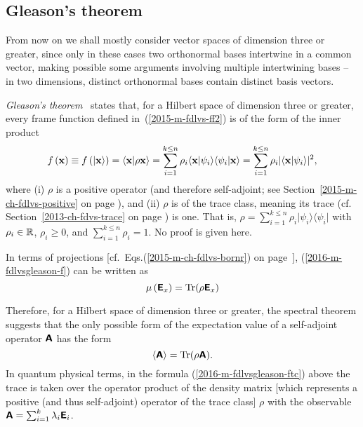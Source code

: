\subsection{Gleason's theorem}
\label{Gleasontheorem}

From now on we shall mostly consider vector spaces of dimension three or greater,
since only in these cases two  orthonormal bases intertwine in a common vector, making possible
some arguments involving multiple intertwining bases  -- in two dimensions,
distinct orthonormal bases contain distinct basis vectors.


{\em Gleason's theorem}~\cite[-50mm]{Gleason,r:dvur-93,pitowsky:218,rich-bridge,peres,hamhalter-book}
states that,
for a Hilbert space of dimension three or greater,
every frame function defined in~(\ref{2015-m-fdlvs-ff2})
is of the form  of the inner product
\begin{equation}
f \left(   {\bf x}   \right)
\equiv
f \left( \vert {\bf x} \rangle \right)
=
\langle {\bf x}  \vert \rho {\bf x} \rangle
=
\sum_{i=1}^{k\le n} \rho_i
\langle {\bf x}  \vert \psi_i\rangle \langle \psi_i \vert {\bf x} \rangle
=
\sum_{i=1}^{k\le n} \rho_i
\vert \langle {\bf x}  \vert \psi_i\rangle \vert^2
,
\label{2016-m-fdlvsgleason-f}
\end{equation}
where
(i) $\rho $
is a positive operator (and therefore self-adjoint;
see Section~\ref{2015-m-ch-fdlvs-positive} on page \pageref{2015-m-ch-fdlvs-positive}),
and
(ii) $\rho $ is
of the trace class,
meaning its trace (cf. Section~\ref{2013-ch-fdvs-trace} on page \pageref{2013-ch-fdvs-trace}) is one.
That is, $\rho=
\sum_{i=1}^{k\le n} \rho_i \vert \psi_i \rangle \langle \psi_i \vert$
with $\rho_i \in {\Bbb R}$, $\rho_i \ge 0$, and $\sum_{i=1}^{k\le n} \rho_i =1$.
No proof is given here.

In terms of projections [cf.~Eqs.(\ref{2015-m-ch-fdlvs-bornr}) on page~\pageref{2015-m-ch-fdlvs-bornr}],
(\ref{2016-m-fdlvsgleason-f}) can be written as
\begin{equation}
\mu \left( \textsf{\textbf{E}}_x \right)
=
{\rm Tr}( \rho  \textsf{\textbf{E}}_x )
\label{2016-m-fdlvsgleason-fproj}
\end{equation}



Therefore, for a Hilbert space of dimension three or greater, the  spectral theorem suggests that
the only possible form of the  expectation value
of a self-adjoint operator  $\textsf{\textbf{A}}$
has the form
\begin{equation}
\langle
\textsf{\textbf{A}}
\rangle
=
\textrm{Tr}({  \rho} \textsf{\textbf{A}}).
\label{2016-m-fdlvsgleason-ftc}
\end{equation}
In quantum physical terms, in the formula (\ref{2016-m-fdlvsgleason-ftc}) above
the trace is taken over
the operator product of the  density matrix [which represents a positive (and thus self-adjoint) operator of the trace class]
${  \rho}$
with the observable $\textsf{\textbf{A}}=\sum_{i=1}^k \lambda_i \textsf{\textbf{E}}_i $.

